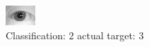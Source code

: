 \begin{figure}[h!]
\begin{center}
\includegraphics[width=0.60\columnwidth]{figures/ID1142_class_2_target_3.png}
\end{center}
\caption{ Classification: 2 actual target: 3}
\label{fig:ID1142_class_2_target_3}
\end{figure}
